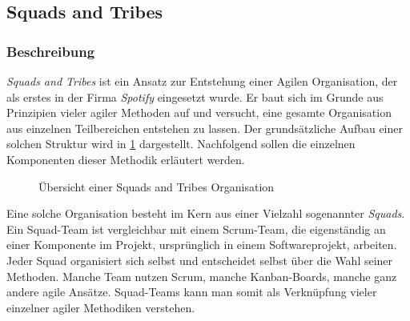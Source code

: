 \subsection{Squads and Tribes}

\subsubsection{Beschreibung}

\textit{Squads and Tribes} ist ein Ansatz zur Entstehung einer Agilen Organisation, der als erstes in der Firma \textit{Spotify} eingesetzt wurde. Er baut sich im Grunde aus Prinzipien vieler agiler Methoden auf und versucht, eine gesamte Organisation aus einzelnen Teilbereichen entstehen zu lassen. Der grundsätzliche Aufbau einer solchen Struktur wird in \ref{fig:squadstribes} dargestellt. Nachfolgend sollen die einzelnen Komponenten dieser Methodik erläutert werden. 

\begin{figure}[H]
	\centering
	\caption[Übersicht einer Squads and Tribes Organisation]{Übersicht einer Squads and Tribes Organisation \protect \cite[S. 1]{kniberg_scaling_2012}}
	\label{fig:squadstribes}
\end{figure}

Eine solche Organisation besteht im Kern aus einer Vielzahl sogenannter \textit{Squads}. Ein Squad-Team ist vergleichbar mit einem Scrum-Team, die eigenständig an einer Komponente im Projekt, ursprünglich in einem Softwareprojekt, arbeiten. Jeder Squad organisiert sich selbst und entscheidet selbst über die Wahl seiner Methoden. Manche Team nutzen Scrum, manche Kanban-Boards, manche ganz andere agile Ansätze. Squad-Teams kann man somit als Verknüpfung vieler einzelner agiler Methodiken verstehen. \cite[S. 2]{kniberg_scaling_2012}

